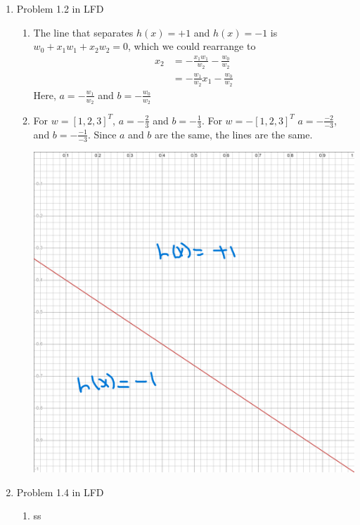 \documentclass{article}
\begin{document}
\begin{enumerate}
        \item Problem 1.2 in LFD
        \begin{enumerate}[label=(\alph*)]
            \item The line that separates $h(x) = +1$ and $h(x) = -1$ is $w_0 + x_1w_1 + x_2w_2 = 0$, which we could rearrange to
            \begin{align*}
                x_2 &= -\frac{x_1w_1}{w_2} - \frac{w_0}{w_2}\\
                &= -\frac{w_1}{w_2}x_1 - \frac{w_0}{w_2}
            \end{align*}
            Here, $a = -\frac{w_1}{w_2}$ and $b = -\frac{w_0}{w_2}$

            \item For $w = [1,2,3]^T$, $a = -\frac{2}{3}$ and $b = -\frac{1}{3}$. For $w = -[1,2,3]^T$ $a = -\frac{-2}{-3}$, and $b = -\frac{-1}{-3}$. Since $a$ and $b$ are the same, the lines are the same.
            \begin{center}
                \includegraphics[scale=0.20]{images/desmos-graph.png}
            \end{center}
        \end{enumerate}

        \item Problem 1.4 in LFD
        \begin{enumerate}
            \item ss
        \end{enumerate}
    \end{enumerate}
\end{document}
